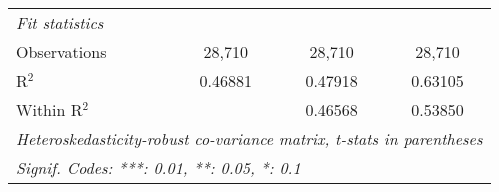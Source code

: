 \begin{tabular}{lccc}
   \midrule
   \emph{Fit statistics}\\
   Observations  & 28,710           & 28,710           & 28,710\\  
   R$^2$         & 0.46881          & 0.47918          & 0.63105\\  
   Within R$^2$  &                  & 0.46568          & 0.53850\\  
   \midrule \midrule
   \multicolumn{4}{l}{\emph{Heteroskedasticity-robust co-variance matrix, t-stats in parentheses}}\\
   \multicolumn{4}{l}{\emph{Signif. Codes: ***: 0.01, **: 0.05, *: 0.1}}\\
\end{tabular}
\par\endgroup


